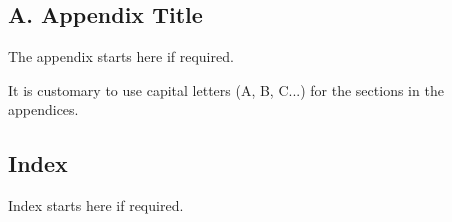\documentclass[11pt]{report}
\numberwithin{figure}{section}
\theoremstyle{plain}
\theoremstyle{definition}
\theoremstyle{corollary}
\theoremstyle{definition}
\theoremstyle{plain}
\theoremstyle{definition}
\theoremstyle{plain}
\begin{document}
\normalsize
{} 
\section*{A. Appendix Title} %
The appendix starts here if required. \par
It is customary to use capital letters (A, B, C...) for the sections in the appendices. 


\begin{center}
\chapter*{Index}

\end{center}
\normalsize
Index starts here if required.


%
%
%



%
%
%
\end{document}
